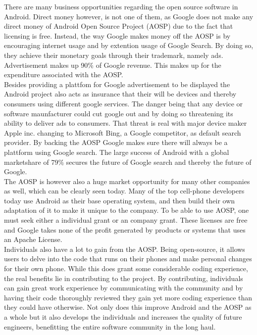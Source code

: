 \documentclass[conference]{IEEEtran}
\begin{document}
There are many business opportunities regarding the open source software in Android. Direct money however, is not one of them, as Google does not make any direct money of Android Open Source Project (AOSP) due to the fact that licensing is free.\cite{Money} Instead, the way Google makes money off the AOSP is by encouraging internet usage and by extention usage of Google Search. By doing so, they achieve their monetary goals through their trademark, namely ads. Advertisement makes up 90\% of Google revenue. \cite{google-revenue} This makes up for the expenditure associated with the AOSP. 
\\Besides providing a plattfom for Google advertisement to be displayed the Android project also acts as insurance that their will be devices and thereby consumers using different google services.\cite{moat} The danger being that any device or software maunfacturer could cut google out and by doing so threatening its ability to deliver ads to consumers. That threat is real with major device maker Apple inc. changing to Microsoft Bing, a Google competitor, as default search provider. \cite{siri-bing} By backing the AOSP Google makes sure there will always be a plattform using Google search. The large success of Android with a global marketshare of 79\% secures the future of Google search and thereby the future of Google. \cite{android-marketshare}
\\The AOSP is however also a huge market opportunity for many other companies as well, which can be clearly seen today. Many of the top cell-phone developers today use Android as their base operating system, and then build their own adaptation of it to make it unique to the company. To be able to use AOSP, one must seek either a individual grant or an company grant.\cite{android-licenses} These licenses are free and Google takes none of the profit generated by products or systems that uses an Apache License.\\
Individuals also have a lot to gain from the AOSP. Being open-source, it allows users to delve into the code that runs on their phones and make personal changes for their own phone. While this does grant some considerable coding experience, the real benefits lie in contributing to the project. By contributing, individuals can gain great work experience by communicating with the community and by having their code thoroughly reviewed they gain yet more coding experience than they could have otherwise. Not only does this improve Android and the AOSP as a whole but it also develops the individuals and increases the quality of future engineers, benefitting the entire software community in the long haul. 
\end{document}
